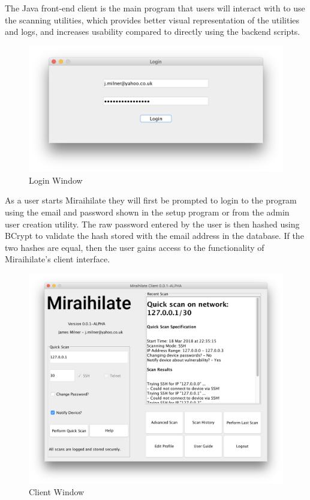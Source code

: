 The Java front-end client is the main program that users will interact with to use the scanning utilities, which provides better visual representation of the utilities and logs, and increases usability compared to directly using the backend scripts.

\vspace{0.5cm}

\begin{figure}[h]
	\centering
	\includegraphics[width=1\linewidth]{img/login_screenshot.png}
	\caption{Login Window}
\end{figure}

As a user starts Miraihilate they will first be prompted to login to the program using the email and password shown in the setup program or from the admin user creation utility. The raw password entered by the user is then hashed using BCrypt to validate the hash stored with the email address in the database. If the two hashes are equal, then the user gains access to the functionality of Miraihilate's client interface.

\begin{figure}[h]
	\centering
	\includegraphics[width=1\linewidth]{img/client_iface_screenshot.png}
	\caption{Client Window}
\end{figure}

